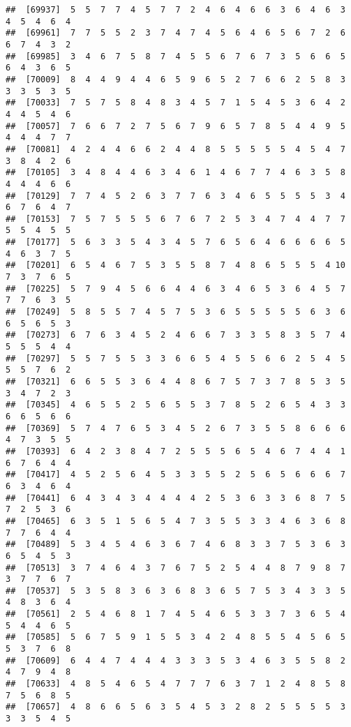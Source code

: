 \documentclass[
]{book}
\begin{document}
\begin{verbatim}
##  [69937]  5  5  7  7  4  5  7  7  2  4  6  4  6  6  3  6  4  6  3  4  5  4  6  4
##  [69961]  7  7  5  5  2  3  7  4  7  4  5  6  4  6  5  6  7  2  6  6  7  4  3  2
##  [69985]  3  4  6  7  5  8  7  4  5  5  6  7  6  7  3  5  6  6  5  6  4  3  6  5
##  [70009]  8  4  4  9  4  4  6  5  9  6  5  2  7  6  6  2  5  8  3  3  3  5  3  5
##  [70033]  7  5  7  5  8  4  8  3  4  5  7  1  5  4  5  3  6  4  2  4  4  5  4  6
##  [70057]  7  6  6  7  2  7  5  6  7  9  6  5  7  8  5  4  4  9  5  4  4  4  7  7
##  [70081]  4  2  4  4  6  6  2  4  4  8  5  5  5  5  5  4  5  4  7  3  8  4  2  6
##  [70105]  3  4  8  4  4  6  3  4  6  1  4  6  7  7  4  6  3  5  8  4  4  4  6  6
##  [70129]  7  7  4  5  2  6  3  7  7  6  3  4  6  5  5  5  5  3  4  6  7  6  4  7
##  [70153]  7  5  7  5  5  5  6  7  6  7  2  5  3  4  7  4  4  7  7  5  5  4  5  5
##  [70177]  5  6  3  3  5  4  3  4  5  7  6  5  6  4  6  6  6  6  5  4  6  3  7  5
##  [70201]  6  5  4  6  7  5  3  5  5  8  7  4  8  6  5  5  5  4 10  7  3  7  6  5
##  [70225]  5  7  9  4  5  6  6  4  4  6  3  4  6  5  3  6  4  5  7  7  7  6  3  5
##  [70249]  5  8  5  5  7  4  5  7  5  3  6  5  5  5  5  5  6  3  6  6  5  6  5  3
##  [70273]  6  7  6  3  4  5  2  4  6  6  7  3  3  5  8  3  5  7  4  5  5  5  4  4
##  [70297]  5  5  7  5  5  3  3  6  6  5  4  5  5  6  6  2  5  4  5  5  5  7  6  2
##  [70321]  6  6  5  5  3  6  4  4  8  6  7  5  7  3  7  8  5  3  5  3  4  7  2  3
##  [70345]  4  6  5  5  2  5  6  5  5  3  7  8  5  2  6  5  4  3  3  6  6  5  6  6
##  [70369]  5  7  4  7  6  5  3  4  5  2  6  7  3  5  5  8  6  6  6  4  7  3  5  5
##  [70393]  6  4  2  3  8  4  7  2  5  5  5  6  5  4  6  7  4  4  1  6  7  6  4  4
##  [70417]  4  5  2  5  6  4  5  3  3  5  5  2  5  6  5  6  6  6  7  6  3  4  6  4
##  [70441]  6  4  3  4  3  4  4  4  4  2  5  3  6  3  3  6  8  7  5  7  2  5  3  6
##  [70465]  6  3  5  1  5  6  5  4  7  3  5  5  3  3  4  6  3  6  8  7  7  6  4  4
##  [70489]  5  3  4  5  4  6  3  6  7  4  6  8  3  3  7  5  3  6  3  6  5  4  5  3
##  [70513]  3  7  4  6  4  3  7  6  7  5  2  5  4  4  8  7  9  8  7  3  7  7  6  7
##  [70537]  5  3  5  8  3  6  3  6  8  3  6  5  7  5  3  4  3  3  5  4  8  3  6  4
##  [70561]  2  5  4  6  8  1  7  4  5  4  6  5  3  3  7  3  6  5  4  5  4  4  6  5
##  [70585]  5  6  7  5  9  1  5  5  3  4  2  4  8  5  5  4  5  6  5  5  3  7  6  8
##  [70609]  6  4  4  7  4  4  4  3  3  3  5  3  4  6  3  5  5  8  2  4  7  9  4  8
##  [70633]  4  8  5  4  6  5  4  7  7  7  6  3  7  1  2  4  8  5  8  7  5  6  8  5
##  [70657]  4  8  6  6  5  6  3  5  4  5  3  2  8  2  5  5  5  5  3  3  3  5  4  5

\end{verbatim}
\end{document}
